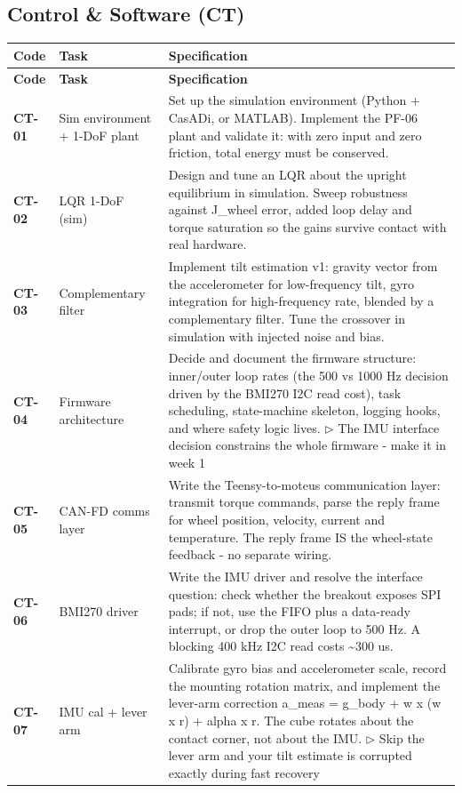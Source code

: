 \subsection{Control \& Software (CT)}
{\small
\setlength{\tabcolsep}{4pt}%
\begin{longtable}{@{}L{1.1cm} L{3.0cm} L{11.0cm}@{}}
\toprule
\textbf{Code} & \textbf{Task} & \textbf{Specification} \\
\midrule\endfirsthead
\toprule
\textbf{Code} & \textbf{Task} & \textbf{Specification} \\
\midrule\endhead
\bottomrule\endfoot
\textbf{CT-01} & Sim environment + 1-DoF plant & Set up the simulation environment (Python + CasADi, or MATLAB). Implement the PF-06 plant and validate it: with zero input and zero friction, total energy must be conserved. \\[2pt]
\textbf{CT-02} & LQR 1-DoF (sim) & Design and tune an LQR about the upright equilibrium in simulation. Sweep robustness against J\_wheel error, added loop delay and torque saturation so the gains survive contact with real hardware. \\[2pt]
\textbf{CT-03} & Complementary filter & Implement tilt estimation v1: gravity vector from the accelerometer for low-frequency tilt, gyro integration for high-frequency rate, blended by a complementary filter. Tune the crossover in simulation with injected noise and bias. \\[2pt]
\textbf{CT-04} & Firmware architecture & Decide and document the firmware structure: inner/outer loop rates (the 500 vs 1000 Hz decision driven by the BMI270 I2C read cost), task scheduling, state-machine skeleton, logging hooks, and where safety logic lives. \newline\textcolor{p0col}{\footnotesize$\triangleright$ The IMU interface decision constrains the whole firmware - make it in week 1} \\[2pt]
\textbf{CT-05} & CAN-FD comms layer & Write the Teensy-to-moteus communication layer: transmit torque commands, parse the reply frame for wheel position, velocity, current and temperature. The reply frame IS the wheel-state feedback - no separate wiring. \\[2pt]
\textbf{CT-06} & BMI270 driver & Write the IMU driver and resolve the interface question: check whether the breakout exposes SPI pads; if not, use the FIFO plus a data-ready interrupt, or drop the outer loop to 500 Hz. A blocking 400 kHz I2C read costs \textasciitilde{}300 us. \\[2pt]
\textbf{CT-07} & IMU cal + lever arm & Calibrate gyro bias and accelerometer scale, record the mounting rotation matrix, and implement the lever-arm correction a\_meas = g\_body + w x (w x r) + alpha x r. The cube rotates about the contact corner, not about the IMU. \newline\textcolor{p0col}{\footnotesize$\triangleright$ Skip the lever arm and your tilt estimate is corrupted exactly during fast recovery} \\[2pt]

\end{longtable}}
